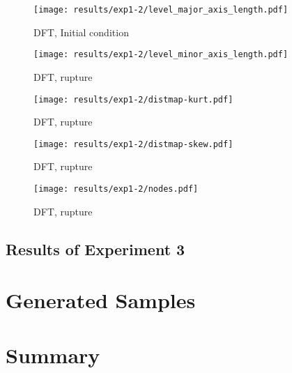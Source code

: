 \begin{figure}[ht] 
	\begin{minipage}[b]{0.5\linewidth}
		\centering
		\texttt{[image: results/exp1-2/level\_major\_axis\_length.pdf]} 
		\caption{DFT, Initial condition} 
		\vspace{4ex}
	\end{minipage}
	\begin{minipage}[b]{0.5\linewidth}
		\centering
		\texttt{[image: results/exp1-2/level\_minor\_axis\_length.pdf]} 
		\caption{DFT, rupture} 
		\vspace{4ex}
	\end{minipage} 
\end{figure}

\begin{figure}[ht] 
	\begin{minipage}[b]{0.5\linewidth}
		\centering
		\texttt{[image: results/exp1-2/distmap-kurt.pdf]} 
		\caption{DFT, rupture} 
		\vspace{4ex}
	\end{minipage} 
	\begin{minipage}[b]{0.5\linewidth}
	\centering
	\texttt{[image: results/exp1-2/distmap-skew.pdf]} 
	\caption{DFT, rupture} 
	\vspace{4ex}
	\end{minipage} 
\end{figure}

\begin{figure}[ht] 
	\centering
		\begin{minipage}[b]{0.5\linewidth}
		\centering
		\texttt{[image: results/exp1-2/nodes.pdf]} 
		\caption{DFT, rupture} 
		\vspace{4ex}
	\end{minipage} 
\end{figure}
\subsection{Results of Experiment 3}



\section{Generated Samples}
\section{Summary}